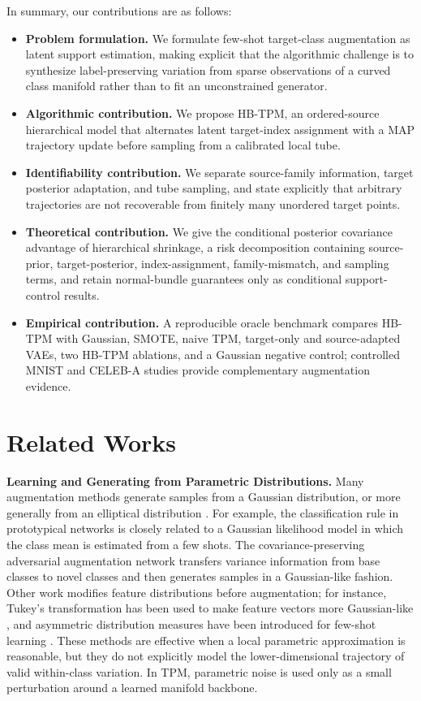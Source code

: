 \documentclass[preprint,12pt,number]{elsarticle}
\begin{document}
In summary, our contributions are as follows: 
\begin{itemize}
	\item \textbf{Problem formulation.} We formulate few-shot target-class augmentation as latent support estimation, making explicit that the algorithmic challenge is to synthesize label-preserving variation from sparse observations of a curved class manifold rather than to fit an unconstrained generator.
	
	\item \textbf{Algorithmic contribution.} We propose HB-TPM, an ordered-source hierarchical model that alternates latent target-index assignment with a MAP trajectory update before sampling from a calibrated local tube.

	\item \textbf{Identifiability contribution.} We separate source-family information, target posterior adaptation, and tube sampling, and state explicitly that arbitrary trajectories are not recoverable from finitely many unordered target points.

	\item \textbf{Theoretical contribution.} We give the conditional posterior covariance advantage of hierarchical shrinkage, a risk decomposition containing source-prior, target-posterior, index-assignment, family-mismatch, and sampling terms, and retain normal-bundle guarantees only as conditional support-control results.

    \item \textbf{Empirical contribution.} A reproducible oracle benchmark compares HB-TPM with Gaussian, SMOTE, naive TPM, target-only and source-adapted VAEs, two HB-TPM ablations, and a Gaussian negative control; controlled MNIST and CELEB-A studies provide complementary augmentation evidence.
\end{itemize}

\section{Related Works}
\textbf{Learning and Generating from Parametric Distributions.} Many augmentation methods generate samples from a Gaussian distribution, or more generally from an elliptical distribution \citep{mao2019homography, meer2004robust}. For example, the classification rule in prototypical networks \citep{snell2017prototypical} is closely related to a Gaussian likelihood model in which the class mean is estimated from a few shots. The covariance-preserving adversarial augmentation network \citep{gao2018low} transfers variance information from base classes to novel classes and then generates samples in a Gaussian-like fashion. Other work modifies feature distributions before augmentation; for instance, Tukey's transformation has been used to make feature vectors more Gaussian-like \citep{yang2021free}, and asymmetric distribution measures have been introduced for few-shot learning \citep{li2020asymmetric}. These methods are effective when a local parametric approximation is reasonable, but they do not explicitly model the lower-dimensional trajectory of valid within-class variation. In TPM, parametric noise is used only as a small perturbation around a learned manifold backbone.
\end{document}
